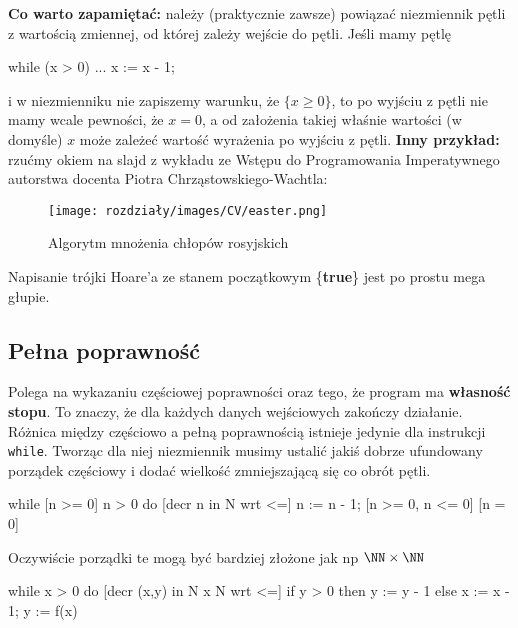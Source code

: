 \textbf{Co warto zapamiętać:} należy (praktycznie zawsze) powiązać niezmiennik pętli z wartością zmiennej, od której zależy wejście do pętli. Jeśli mamy pętlę \begin{cpp}
    while (x > 0) {
        ...
        x := x - 1;
    }
\end{cpp}
i w niezmienniku nie zapiszemy warunku, że $\{x \ge 0\}$, to po wyjściu z pętli nie mamy wcale pewności, że $x=0$, a od założenia takiej właśnie wartości (w domyśle) $x$ może zależeć wartość wyrażenia po wyjściu z pętli.\newline
\textbf{Inny przykład:} rzućmy okiem na slajd z wykładu ze Wstępu do Programowania Imperatywnego autorstwa docenta Piotra Chrząstowskiego-Wachtla:
\begin{figure}[H]
    \centering
    \texttt{[image: rozdziały/images/CV/easter.png]}
    \caption{Algorytm mnożenia chłopów rosyjskich}
\end{figure}
Napisanie trójki Hoare'a ze stanem początkowym \{\textbf{true}\} jest po prostu mega głupie.

\subsection{Pełna poprawność}
Polega na wykazaniu częściowej poprawności oraz tego, że program ma \textbf{własność stopu}. To znaczy, że dla każdych danych wejściowych zakończy działanie. Różnica między częściowo a pełną poprawnością istnieje jedynie dla instrukcji \texttt{while}. Tworząc dla niej niezmiennik musimy ustalić jakiś dobrze ufundowany porządek częściowy i dodać wielkość zmniejszającą się co obrót pętli.

\begin{example}
    \begin{cpp}
    [n >= 0]
    while [n >= 0] n > 0 do [decr n in N wrt <=] {
        n := n - 1;
    }
    [n >= 0, n <= 0]
    [n = 0]

    \end{cpp}
\end{example}

Oczywiście porządki te mogą być bardziej złożone jak np $\NN \times \NN$

\begin{example}
    \begin{cpp}
    while x > 0 do [decr (x,y) in N x N wrt <=] {
        if y > 0 then
            y := y - 1    
        else
            x := x - 1;
            y := f(x)
    }
    \end{cpp}
\end{example}

